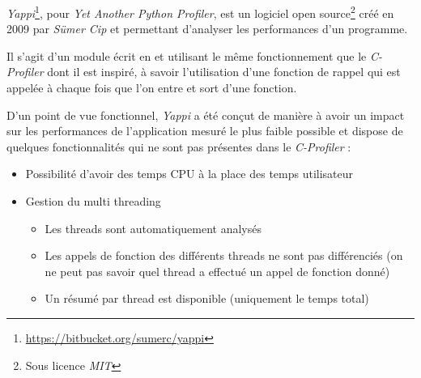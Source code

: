 \emph{Yappi}\footnote{\url{https://bitbucket.org/sumerc/yappi}}, pour \emph{Yet Another Python Profiler}, est un logiciel open source\footnote{Sous licence \emph{MIT}} créé en 2009 par \emph{Sümer Cip} et permettant d'analyser les performances d'un programme.

Il s'agit d'un module écrit en \C et utilisant le même fonctionnement que le \emph{C-Profiler} dont il est inspiré, à savoir l'utilisation d'une fonction de rappel qui est appelée à chaque fois que l'on entre et sort d'une fonction.

D'un point de vue fonctionnel, \emph{Yappi} a été conçut de manière à avoir un impact sur les performances de l'application mesuré le plus faible possible et dispose de quelques fonctionnalités qui ne sont pas présentes dans le \emph{C-Profiler} :
\begin{itemize}
\item Possibilité d'avoir des temps CPU à la place des temps utilisateur
\item Gestion du multi threading
\begin{itemize}
\item Les threads sont automatiquement analysés
\item Les appels de fonction des différents threads ne sont pas différenciés (on ne peut pas savoir quel thread a effectué un appel de fonction donné) 
\item Un résumé par thread est disponible (uniquement le temps total)
\end{itemize}
\end{itemize}